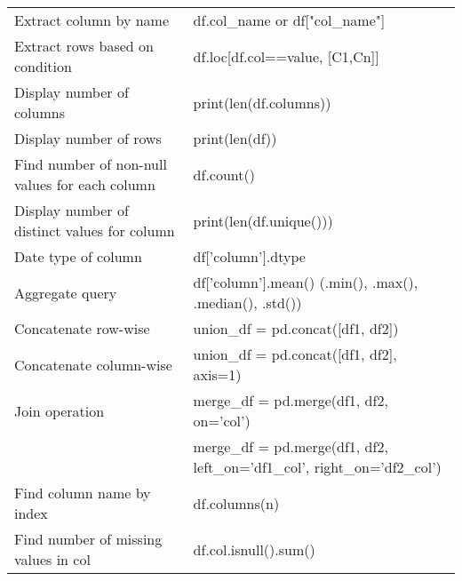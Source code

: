 \documentclass[a4paper,8pt,twocolumn]{extarticle}
\begin{document}
\begin{table}[h]
{\begin{tabular}{p{0.4\linewidth} | p{0.6\linewidth}}
Extract column by name                         & df.col\_name or df{[}"col\_name"{]}                                       \\
Extract rows based on condition                & df.loc{[}df.col==value, {[}C1,Cn{]}{]}                                    \\
Display number of columns                      & print(len(df.columns))                                                    \\
Display number of rows                         & print(len(df))                                                            \\
Find number of non-null values for each column & df.count()                                                                \\
Display number of distinct values for column   & print(len(df.unique()))                                                   \\
Date type of column                            & df{[}'column'{]}.dtype                                                    \\
Aggregate query                                & df{[}'column'{]}.mean() (.min(), .max(), .median(), .std())               \\
Concatenate row-wise                           & union\_df = pd.concat({[}df1, df2{]})                                     \\
Concatenate column-wise                        & union\_df = pd.concat({[}df1, df2{]}, axis=1)                             \\
Join operation                                 & merge\_df = pd.merge(df1, df2, on='col')                                  \\
                                               & merge\_df = pd.merge(df1, df2, left\_on='df1\_col', right\_on='df2\_col') \\
Find column name by index                      & df.columns(n)                                                             \\
Find number of missing values in col           & df.col.isnull().sum()                                                    
\end{tabular}%
}
\end{table}
\end{document}
